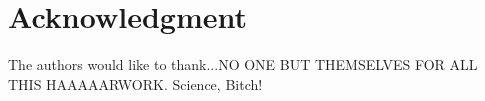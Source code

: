 \documentclass[conference]{IEEEtran}
\begin{document}

%

%

\section*{Acknowledgment}

The authors would like to thank...NO ONE BUT THEMSELVES FOR ALL THIS HAAAAARWORK. Science, Bitch!


\ifCLASSOPTIONcaptionsoff
  \newpage
\fi




\end{document}
